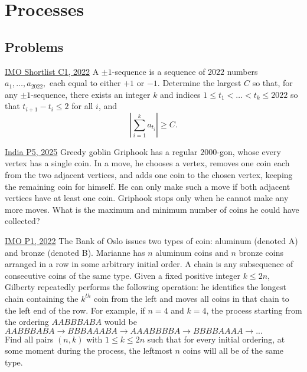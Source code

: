 \chapter{Processes}
\section{Problems}
\begin{problem}{1}{\href{https://artofproblemsolving.com/community/q1h3107334p34892180}{IMO Shortlist C1, 2022}} 
	A $\pm 1$-sequence is a sequence of $2022$ numbers $a_1, \ldots, a_{2022},$ each equal to either $+1$ or $-1$. Determine the largest $C$ so that, for any $\pm 1$-sequence, there exists an integer $k$ and indices $1 \le t_1 < \ldots < t_k \le 2022$ so that $t_{i+1} - t_i \le 2$ for all $i$, and$$\left| \sum_{i = 1}^{k} a_{t_i} \right| \ge C.$$
\end{problem}

\begin{problem}{2}{\href{https://artofproblemsolving.com/community/q1h3483100p34496847}{India P5, 2025}}
	Greedy goblin Griphook has a regular $2000$-gon, whose every vertex has a single coin. In a move, he chooses a vertex, removes one coin each from the two adjacent vertices, and adds one coin to the chosen vertex, keeping the remaining coin for himself. He can only make such a move if both adjacent vertices have at least one coin. Griphook stops only when he cannot make any more moves. What is the maximum and minimum number of coins he could have collected?
\end{problem}

\begin{problem}{3}{\href{https://artofproblemsolving.com/community/q1h2883211p34203276}{IMO P1, 2022}}
	The Bank of Oslo issues two types of coin: aluminum (denoted A) and bronze (denoted B). Marianne has $n$ aluminum coins and $n$ bronze coins arranged in a row in some arbitrary initial order. A chain is any subsequence of consecutive coins of the same type. Given a fixed positive integer $k \leq 2n$, Gilberty repeatedly performs the following operation: he identifies the longest chain containing the $k^{th}$ coin from the left and moves all coins in that chain to the left end of the row. For example, if $n=4$ and $k=4$, the process starting from the ordering $AABBBABA$ would be $AABBBABA \to BBBAAABA \to AAABBBBA \to BBBBAAAA \to ...$\\
	Find all pairs $(n,k)$ with $1 \leq k \leq 2n$ such that for every initial ordering, at some moment during the process, the leftmost $n$ coins will all be of the same type.
\end{problem}


